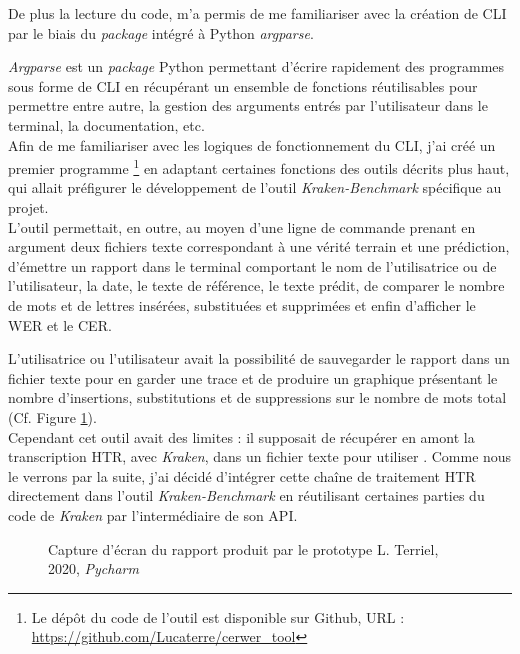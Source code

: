 De plus la lecture du code, m'a permis de me familiariser avec la création de CLI par le biais du \textit{package} intégré à Python \textit{argparse}. 

\textit{Argparse} est un \textit{package} Python permettant d'écrire rapidement des programmes sous forme de CLI en récupérant un ensemble de fonctions réutilisables pour permettre entre autre, la gestion des arguments entrés par l'utilisateur dans le terminal, la documentation, etc.\\

Afin de me familiariser avec les logiques de fonctionnement du CLI, j'ai créé un premier programme \footnote{Le dépôt du code de l'outil  est disponible sur Github, URL : \url{https://github.com/Lucaterre/cerwer_tool}} en adaptant certaines fonctions des outils décrits plus haut, qui allait préfigurer le développement de l'outil \textit{Kraken-Benchmark} spécifique au projet.\\

L'outil  permettait, en outre, au moyen d'une ligne de commande prenant en argument deux fichiers texte correspondant à une vérité terrain et une prédiction, d'émettre un rapport dans le terminal comportant le nom de l'utilisatrice ou de l'utilisateur, la date, le texte de référence, le texte prédit, de comparer le nombre de mots et de lettres insérées, substituées et supprimées et enfin d'afficher le WER et le CER.

L'utilisatrice ou l'utilisateur avait la possibilité de sauvegarder le rapport dans un fichier texte pour en garder une trace et de produire un graphique présentant le nombre d'insertions, substitutions et de suppressions sur le nombre de mots total (Cf. Figure \ref{fig:cerwer}).\\

Cependant cet outil avait des limites : il supposait de récupérer en amont la transcription HTR, avec \textit{Kraken}, dans un fichier texte pour utiliser . Comme nous le verrons par la suite, j'ai décidé d'intégrer cette chaîne de traitement HTR directement dans l'outil \textit{Kraken-Benchmark} en réutilisant certaines parties du code de \textit{Kraken} par l'intermédiaire de son API.

\begin{figure}[h]
    \centering
    \centerline{}
    \caption{Capture d'écran du rapport produit par le prototype  \textcopyright L. Terriel, 2020, \textit{Pycharm}}
    \label{fig:cerwer}
\end{figure}
\newpage

